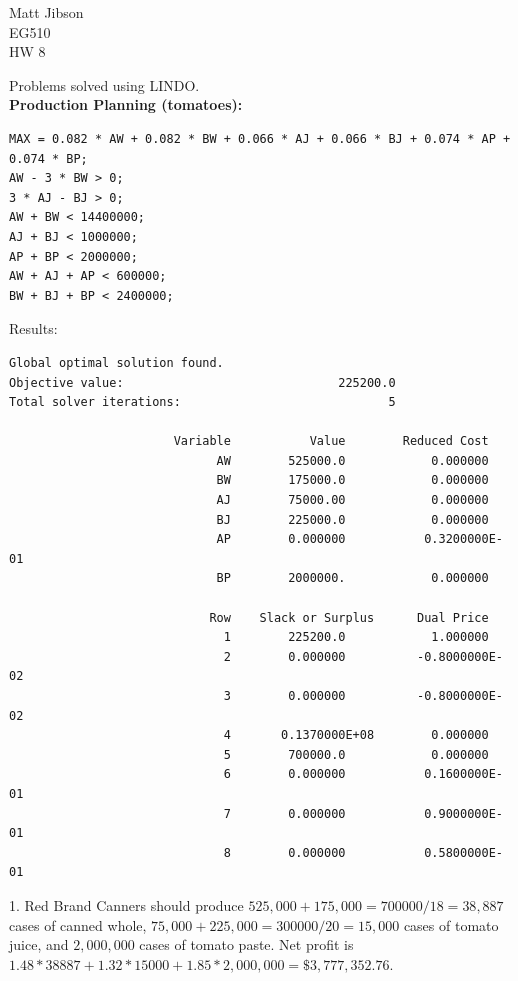 \documentclass{article}
\begin{document}
\begin{flushright}
Matt Jibson \\
EG510 \\
HW 8
\end{flushright}

Problems solved using LINDO. \\

\textbf{Production Planning (tomatoes):}

\begin{verbatim}
MAX = 0.082 * AW + 0.082 * BW + 0.066 * AJ + 0.066 * BJ + 0.074 * AP + 0.074 * BP;
AW - 3 * BW > 0;
3 * AJ - BJ > 0;
AW + BW < 14400000;
AJ + BJ < 1000000;
AP + BP < 2000000;
AW + AJ + AP < 600000;
BW + BJ + BP < 2400000;
\end{verbatim}

Results:

\begin{verbatim}
Global optimal solution found.
Objective value:                              225200.0
Total solver iterations:                             5

                       Variable           Value        Reduced Cost
                             AW        525000.0            0.000000
                             BW        175000.0            0.000000
                             AJ        75000.00            0.000000
                             BJ        225000.0            0.000000
                             AP        0.000000           0.3200000E-01
                             BP        2000000.            0.000000

                            Row    Slack or Surplus      Dual Price
                              1        225200.0            1.000000
                              2        0.000000          -0.8000000E-02
                              3        0.000000          -0.8000000E-02
                              4       0.1370000E+08        0.000000
                              5        700000.0            0.000000
                              6        0.000000           0.1600000E-01
                              7        0.000000           0.9000000E-01
                              8        0.000000           0.5800000E-01
\end{verbatim}

1. Red Brand Canners should produce $525,000 + 175,000 = 700000 / 18 = 38,887$ cases of canned whole, $75,000 + 225,000 = 300000 / 20 = 15,000$ cases of tomato juice, and $2,000,000$ cases of tomato paste. Net profit is $1.48 * 38887 + 1.32 * 15000 + 1.85 * 2,000,000 = \$3,777,352.76$. \\
\end{document}
